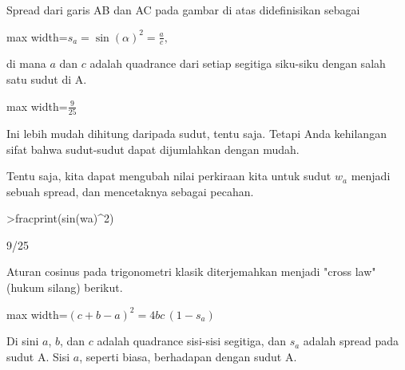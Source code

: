 \documentclass[a4paper,11pt,oneside,enabledeprecatedfontcommands]{scrbook}
\newenvironment{eulernotebook}{}{}
\newenvironment{eulercomment}{\par\medskip\noindent}{\par\medskip}
\newenvironment{eulerformula}{%
    \par\medskip\noindent
    \renewcommand{\[}{\begin{center}\begin{adjustbox}{max width=\textwidth}$\displaystyle}%
    \renewcommand{\]}{$\end{adjustbox}\end{center}}%
}{\par\medskip}
\begin{document}
\begin{eulernotebook}
\begin{eulercomment}
Spread dari garis AB dan AC pada gambar di atas didefinisikan sebagai
\end{eulercomment}
\begin{eulerformula}
\[
s_a = \sin(\alpha)^2 = \frac{a}{c},
\]
\end{eulerformula}
\begin{eulercomment}
di mana $a$ dan $c$ adalah quadrance dari setiap segitiga siku-siku dengan salah satu sudut di A.
\end{eulercomment}
\begin{eulerformula}
\[
\]
\end{eulerformula}
\begin{eulercomment}
Ini lebih mudah dihitung daripada sudut, tentu saja. Tetapi Anda kehilangan sifat bahwa sudut-sudut
dapat dijumlahkan dengan mudah.

Tentu saja, kita dapat mengubah nilai perkiraan kita untuk sudut $w_a$ menjadi sebuah spread, dan
mencetaknya sebagai pecahan.
\end{eulercomment}
\begin{eulerprompt}
>fracprint(sin(wa)^2)
\end{eulerprompt}
\begin{euleroutput}
9/25
\end{euleroutput}
\begin{eulercomment}
Aturan cosinus pada trigonometri klasik diterjemahkan menjadi "cross law" (hukum silang) berikut.
\end{eulercomment}
\begin{eulerformula}
\[
(c+b-a)^2 = 4 b c \, (1-s_a)
\]
\end{eulerformula}
\begin{eulercomment}
Di sini $a$, $b$, dan $c$ adalah quadrance sisi-sisi segitiga, dan $s_a$ adalah spread pada sudut A. Sisi $a$,
seperti biasa, berhadapan dengan sudut A.


\end{eulercomment}
\end{eulernotebook}
\end{document}
